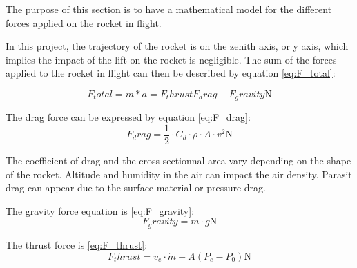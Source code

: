 The purpose of this section is to have a mathematical model for the different forces applied on the rocket in flight. 

In this project, the trajectory of the rocket is on the zenith axis, or y axis, which implies the impact of the lift on the rocket is negligible. The sum of the forces applied to the rocket in flight can then be described by equation \eqref{eq:F_total}:

\begin{equation}
F_total = m*a = F_thrust  F_drag - F_gravity \si{\newton} \label{eq:F_total}
\end{equation}
\startexplain
{}
\stopexplain

The drag force can be expressed by equation \eqref{eq:F_drag}:
\begin{equation}
F_drag = \frac{1}{2} \cdot C_d \cdot \rho \cdot A \cdot v^2 \si{\newton} \label{eq:F_drag}
\end{equation}
\startexplain
{}
\stopexplain
	
The coefficient of drag and the cross sectionnal area vary depending on the shape of the rocket. Altitude and humidity in the air can impact the air density. Parasit drag can appear due to the surface material or pressure drag.

The gravity force equation is \eqref{eq:F_gravity}:
\begin{equation}
F_gravity = m \cdot g \si{\newton} \label{eq:F_gravity}
\end{equation}
\startexplain
{}
\stopexplain
	

The thrust force is \eqref{eq:F_thrust}:
\begin{equation}
F_thrust = v_e \cdot \ddot{m} + A (P_e -P_0) \si{\newton} \label{eq:F_thrust}
\end{equation}
\startexplain
{}
\stopexplain


